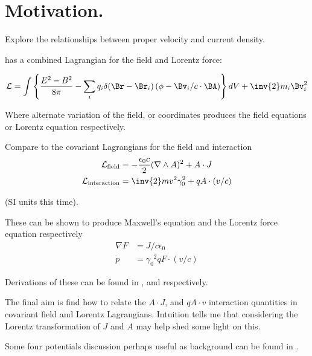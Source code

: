 \documentclass{article}
\author{Peeter Joot \quad peeter.joot@gmail.com}
\date{ October 17, 2008.  Last Revision: $Date: 2009/02/22 15:11:52 $ }
\newcommand{\LL}[0]{\mathcal{L}}
\newcommand{\grad}[0]{\nabla}
\newcommand{\pdot}[0]{\dot{p}}
\begin{document}

\tableofcontents

\section{ Motivation.}

Explore the relationships between proper velocity and current density.

\cite{goldstein1951cm} has a combined Lagrangian for the field and Lorentz force:

\begin{align*}
\LL = \int \left\{ \frac{E^2 - B^2}{8 \pi} - \sum_i q_i \delta(\Br-\Br_i)\left(\phi - \Bv_i/c \cdot \BA\right)\right\} dV + \inv{2} m_i \Bv_i^2
\end{align*}

Where alternate variation of the field, or coordinates produces the field equations or Lorentz equation respectively.

Compare to the covariant Lagrangians for the field and interaction 
\begin{align}\label{eqn:maxlag}
\LL_{\text{field}} &= -\frac{\epsilon_0 c}{2} (\grad \wedge A)^2 + A \cdot J \\
\LL_{\text{interaction}} &= \inv{2} m v^2 \gamma_0^2 + q A \cdot (v/c)
\end{align}

(SI units this time).

These can be shown to produce Maxwell's equation and the Lorentz force equation respectively
\begin{align}
\grad F &= J/c\epsilon_0 \\
\pdot &= {\gamma_0}^2 q F \cdot (v/c)
\end{align}

Derivations of these can be found in \cite{PJFieldLagrangian}, and \cite{PJSrLorentzForce} respectively.

The final aim is 
find how to relate the $A\cdot J$, and $q A \cdot v$ interaction quantities in covariant field and
Lorentz Lagrangians.  Intuition tells me that considering the Lorentz transformation of $J$ and $A$ may help
shed some light on this.

Some four potentials discussion perhaps useful as background can be found in \cite{PJFourPotential}.

\section{ }



\end{document}
